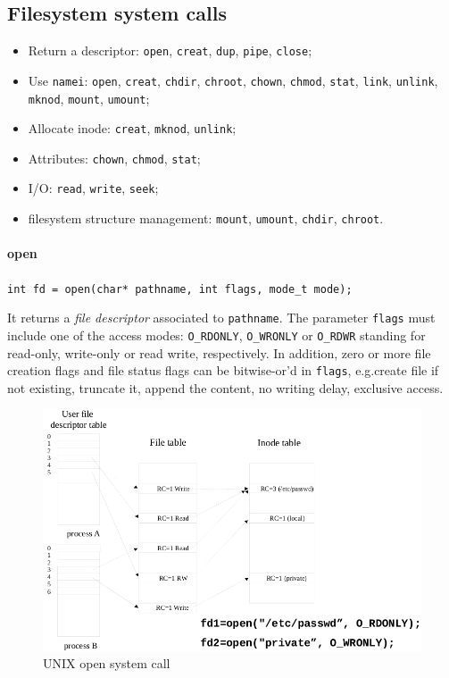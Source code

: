 \subsection{Filesystem system calls}
\begin{itemize}
\item Return a descriptor: \texttt{open}, \texttt{creat}, \texttt{dup}, \texttt{pipe}, \texttt{close};
\item Use \texttt{namei}: \texttt{open}, \texttt{creat}, \texttt{chdir}, \texttt{chroot}, \texttt{chown}, \texttt{chmod}, \texttt{stat}, \texttt{link}, \texttt{unlink}, \texttt{mknod}, \texttt{mount}, \texttt{umount};
\item Allocate inode: \texttt{creat}, \texttt{mknod}, \texttt{unlink};
\item Attributes: \texttt{chown}, \texttt{chmod}, \texttt{stat};
\item I/O: \texttt{read}, \texttt{write}, \texttt{seek};
\item filesystem structure management: \texttt{mount}, \texttt{umount}, \texttt{chdir}, \texttt{chroot}.
\end{itemize}

\paragraph{open}
\texttt{int fd = open(char* pathname, int flags, mode\_t mode);}

It returns a \emph{file descriptor} associated to \texttt{pathname}. The parameter \texttt{flags} must include one of the access modes: \texttt{O\_RDONLY}, \texttt{O\_WRONLY} or \texttt{O\_RDWR} standing for read-only, write-only or read write, respectively. In addition, zero or more file creation flags and file status flags can be bitwise-or'd in \texttt{flags}, e.g.\@ create file if not existing, truncate it, append the content, no writing delay, exclusive access.

\begin{figure}[hbtp]
\centering
\includegraphics[scale=0.3]{images/file_system/open_system_call.jpg}
\caption{UNIX open system call}
\end{figure}


